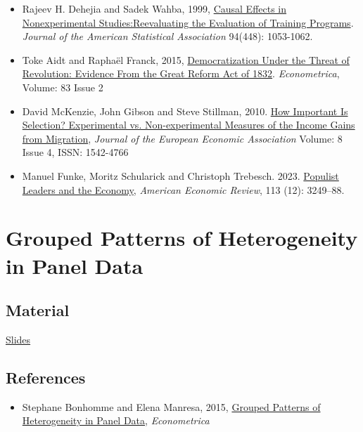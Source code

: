 \documentclass[a4paper,french,11pt]{article}
\begin{document}
\begin{itemize}
\item Rajeev H. Dehejia and Sadek Wahba, 1999, \href{https://drive.google.com/file/d/1Umssr3OadMwOC-KyyuK7HYlnC17J4zor/view?usp=sharing}{Causal Effects in Nonexperimental Studies:Reevaluating the Evaluation of Training Programs}. \textit{Journal of the American Statistical Association} 94(448): 1053-1062.

\item Toke Aidt and Raphaël Franck, 2015, \href{https://drive.google.com/open?id=1WW4kW_5CYWrQffazCx1uIukYBvK1Ibbd}{Democratization Under the Threat of Revolution: Evidence From the Great Reform Act of 1832}. \textit{Econometrica}, Volume: 83 Issue 2




\item David McKenzie, John Gibson and Steve Stillman, 2010. \href{https://drive.google.com/open?id=1_5TcTRD8YCi12LhVJh5ZJWl4xsPokTg0}{How Important Is Selection? Experimental vs. Non-experimental Measures of the Income Gains from Migration}, \textit{Journal of the European Economic Association} Volume: 8 Issue 4, ISSN: 1542-4766
\item  Manuel Funke, Moritz Schularick and Christoph Trebesch. 2023. \href{https://drive.google.com/file/d/1CIJBv8KWCTudYXeV12RivfiU_4BQEf4z/view?usp=drive_link}{Populist Leaders and the Economy}, \textit{American Economic Review}, 113 (12): 3249–88. 
\end{itemize}


\section{Grouped Patterns of Heterogeneity in Panel Data}

\subsection{Material}

\href{https://drive.google.com/file/d/1zrpNTI5htR9Kx4fyABAbOwpF0NLFtHgQ/view}{Slides}
\subsection*{References}

\begin{itemize}
\item Stephane Bonhomme and Elena Manresa, 2015, \href{https://drive.google.com/file/d/16Gk7Pu8xRlKyw4PBf6dLifyxv_q6Js-Q/view?usp=share_link}{Grouped Patterns of Heterogeneity in Panel Data}, \textit{Econometrica}


\end{itemize}
\end{document}
